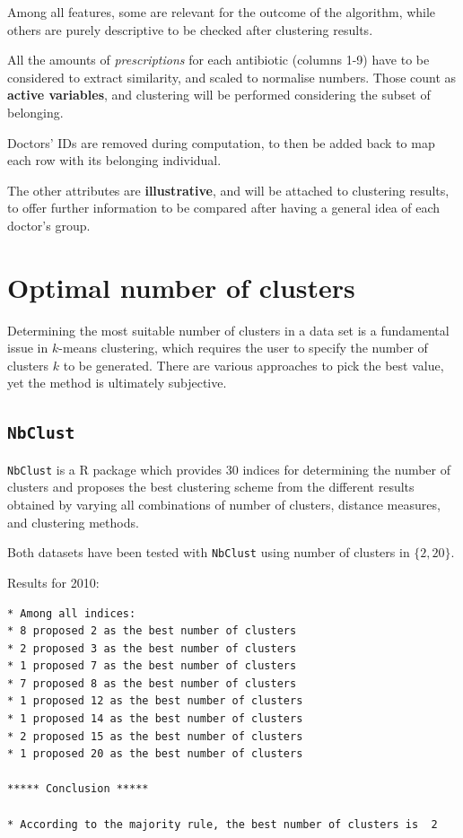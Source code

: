 Among all features, some are relevant for the outcome of the algorithm, while others are purely descriptive to be checked after clustering results.

All the amounts of \textit{prescriptions} for each antibiotic (columns 1-9) have to be considered to extract similarity, and scaled to normalise numbers. Those count as \textbf{active variables}, and clustering will be performed considering the subset of belonging.

Doctors' IDs are removed during computation, to then be added back to map each row with its belonging individual. 

The other attributes are \textbf{illustrative}, and will be attached to clustering results, to offer further information to be compared after having a general idea of each doctor's group. 

\section{Optimal number of clusters}
Determining the most suitable number of clusters in a data set is a fundamental issue in $k$-means clustering, which requires the user to specify the number of clusters $k$ to be generated. There are various approaches to pick the best value, yet the method is ultimately subjective\cite{silhouette}.

\subsection{\texttt{NbClust}}
\texttt{NbClust} is a R package which provides 30 indices for determining the number of clusters and proposes the best clustering scheme from the different results obtained by varying all combinations of number of clusters, distance measures, and clustering methods. 

Both datasets have been tested with \texttt{NbClust} using number of clusters in $\{2, 20\}$.

Results for 2010:
\begin{lstlisting}
* Among all indices:                                                
* 8 proposed 2 as the best number of clusters 
* 2 proposed 3 as the best number of clusters 
* 1 proposed 7 as the best number of clusters 
* 7 proposed 8 as the best number of clusters 
* 1 proposed 12 as the best number of clusters 
* 1 proposed 14 as the best number of clusters 
* 2 proposed 15 as the best number of clusters 
* 1 proposed 20 as the best number of clusters 

***** Conclusion *****                            

* According to the majority rule, the best number of clusters is  2 
\end{lstlisting}

